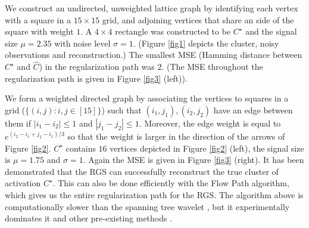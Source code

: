 We construct an undirected, unweighted lattice graph by identifying each vertex with a square in a $15 \times 15$ grid, and adjoining vertices that share an side of the square with weight $1$.
A $4 \times 4$ rectangle was constructed to be $C^\star$ and the signal size $\mu = 2.35$ with noise level $\sigma = 1$. (Figure \ref{fig1} depicts the cluster, noisy observations and reconstruction.)
The smallest MSE (Hamming distance between $C^\star$ and $\hat C$) in the regularization path was $2$. (The MSE throughout the regularization path is given in Figure \ref{fig3} (left)).

We form a weighted directed graph by associating the vertices to squares in a grid ($\{(i,j) : i, j \in [15]\}$) such that $(i_1,j_1), (i_2,j_2)$ have an edge between them if $|i_1 - i_2| \le 1$ and $|j_1 - j_2| \le 1$.  
Moreover, the edge weight is equal to $e^{(i_2 - i_1 + j_2 - i_1)/3}$ so that the weight is larger in the direction of the arrows of Figure \ref{fig2}.
$C^\star$ contains $16$ vertices depicted in Figure \ref{fig2} (left), the signal size is $\mu = 1.75$ and $\sigma = 1$.
Again the MSE is given in Figure \ref{fig3} (right).
It has been demonstrated that the RGS can successfully reconstruct the true cluster of activation $C^\star$.
This can also be done efficiently with the Flow Path algorithm, which gives us the entire regularization path for the RGS.
The algorithm above is computationally slower than the spanning tree wavelet \cite{sharpnack2012detecting}, but it experimentally dominates it and other pre-existing methods \cite{sharpnack2013near-optimal}.
